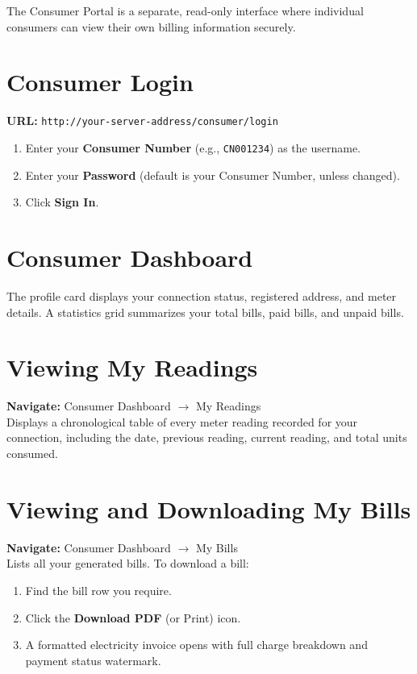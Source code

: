 \documentclass[12pt, a4paper]{report}
\begin{document}
The Consumer Portal is a separate, read-only interface where individual consumers can view their own billing information securely.

\section{Consumer Login}
\textbf{URL:} \texttt{http://your-server-address/consumer/login}

\begin{enumerate}
    \item Enter your \textbf{Consumer Number} (e.g., \texttt{CN001234}) as the username.
    \item Enter your \textbf{Password} (default is your Consumer Number, unless changed).
    \item Click \textbf{Sign In}.
\end{enumerate}

\section{Consumer Dashboard}
The profile card displays your connection status, registered address, and meter details. A statistics grid summarizes your total bills, paid bills, and unpaid bills. 

\section{Viewing My Readings}
\textbf{Navigate:} Consumer Dashboard $\rightarrow$ My Readings\\
Displays a chronological table of every meter reading recorded for your connection, including the date, previous reading, current reading, and total units consumed.

\section{Viewing and Downloading My Bills}
\textbf{Navigate:} Consumer Dashboard $\rightarrow$ My Bills\\
Lists all your generated bills. To download a bill:
\begin{enumerate}
    \item Find the bill row you require.
    \item Click the \textbf{Download PDF} (or Print) icon.
    \item A formatted electricity invoice opens with full charge breakdown and payment status watermark.
\end{enumerate}
\end{document}

